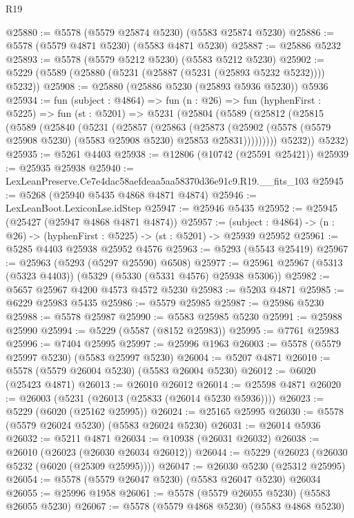 \begin{lexlean}{R19}
\begin{coremodule}
@25880 := @5578 (@5579 @25874 @5230) (@5583 @25874 @5230)
@25886 := @5578 (@5579 @4871 @5230) (@5583 @4871 @5230)
@25887 := @25886 @5232
@25893 := @5578 (@5579 @5212 @5230) (@5583 @5212 @5230)
@25902 := @5229 (@5589 (@25880 (@5231 (@25887 (@5231 (@25893 @5232 @5232)))) @5232))
@25908 := @25880 (@25886 @5230 (@25893 @5936 @5230)) @5936
@25934 := fun (subject : @4864) =>
  fun (n : @26) =>
  fun (hyphenFirst : @5225) =>
  fun (st : @5201) =>
  @5231
    (@25804
      (@5589
        (@25812
          (@25815
            (@5589
              (@25840
                (@5231
                  (@25857
                    (@25863
                      (@25873
                        (@25902
                          (@5578 (@5579 @25908 @5230) (@5583 @25908 @5230) @25853 @25831)))))))))
          @5232))
      @5232)
@25935 := @5261 @4403
@25938 := @12806 (@10742 (@25591 @25421))
@25939 := @25935 @25938
@25940 := LexLeanPreserve.Ce7e4dac58aefdeaa5aa58370d36e91c9.R19.__fits_103
@25945 := @5268 (@25940 @5435 @4868 @4871 @4874)
@25946 := LexLeanBoot.LexiconLse.idStep
@25947 := @25946 @5435
@25952 := @25945 (@25427 (@25947 @4868 @4871 @4874))
@25957 := (subject : @4864) -> (n : @26) -> (hyphenFirst : @5225) -> (st : @5201) -> @25939 @25952
@25961 := @5285 @4403 @25938 @25952 @4576
@25963 := @5293 (@5543 @25419)
@25967 := @25963 (@5293 (@5297 @25590) @6508)
@25977 := @25961 @25967 (@5313 (@5323 @4403)) (@5329 (@5330 (@5331 @4576) @25938 @5306))
@25982 := @5657 @25967 @4200 @4573 @4572 @5230
@25983 := @5203 @4871
@25985 := @6229 @25983 @5435
@25986 := @5579 @25985
@25987 := @25986 @5230
@25988 := @5578 @25987
@25990 := @5583 @25985 @5230
@25991 := @25988 @25990
@25994 := @5229 (@5587 (@8152 @25983))
@25995 := @7761 @25983
@25996 := @7404 @25995
@25997 := @25996 @1963
@26003 := @5578 (@5579 @25997 @5230) (@5583 @25997 @5230)
@26004 := @5207 @4871
@26010 := @5578 (@5579 @26004 @5230) (@5583 @26004 @5230)
@26012 := @6020 (@25423 @4871)
@26013 := @26010 @26012
@26014 := @25598 @4871
@26020 := @26003 (@5231 (@26013 (@25833 (@26014 @5230 @5936))))
@26023 := @5229 (@6020 (@25162 @25995))
@26024 := @25165 @25995
@26030 := @5578 (@5579 @26024 @5230) (@5583 @26024 @5230)
@26031 := @26014 @5936
@26032 := @5211 @4871
@26034 := @10938 (@26031 @26032)
@26038 := @26010 (@26023 (@26030 @26034 @26012))
@26044 := @5229 (@26023 (@26030 @5232 (@6020 (@25309 @25995))))
@26047 := @26030 @5230 (@25312 @25995)
@26054 := @5578 (@5579 @26047 @5230) (@5583 @26047 @5230) @26034
@26055 := @25996 @1958
@26061 := @5578 (@5579 @26055 @5230) (@5583 @26055 @5230)
@26067 := @5578 (@5579 @4868 @5230) (@5583 @4868 @5230)

\end{coremodule}
\end{lexlean}
